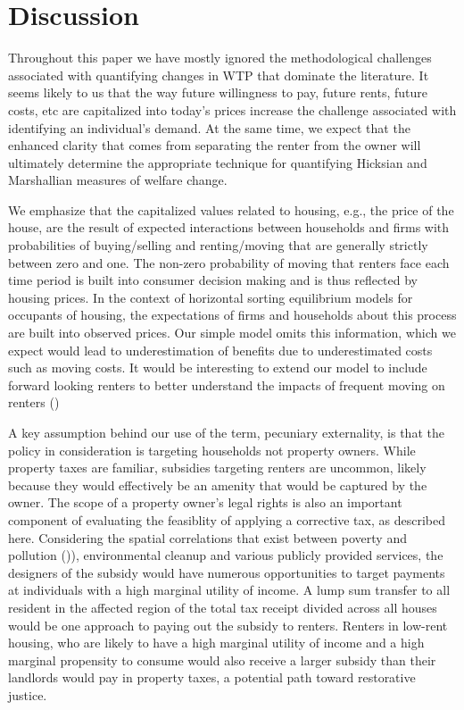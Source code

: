 \documentclass[ecta,nameyear,draft]{econsocart}
\theoremstyle{plain}
\theoremstyle{remark}
\begin{document}
\section{Discussion}
Throughout this paper we have mostly ignored the methodological challenges associated with quantifying changes in WTP that dominate the literature. It seems likely to us that the way future willingness to pay, future rents, future costs, etc are capitalized into today's prices increase the challenge associated with identifying an individual's demand. At the same time, we expect that the enhanced clarity that comes from separating the renter from the owner will ultimately determine the appropriate technique for quantifying Hicksian and Marshallian measures of welfare change.

We emphasize that the capitalized values related to housing, e.g., the price of the house, are the result of expected interactions between households and firms with probabilities of buying/selling and renting/moving that are generally strictly between zero and one. The non-zero probability of moving that renters face each time period is built into consumer decision making and is thus reflected by housing prices. In the context of horizontal sorting equilibrium models for occupants of housing, the expectations of firms and households about this process are built into observed prices. Our simple model omits this information, which we expect would lead to underestimation of benefits due to underestimated costs such as moving costs. It would be interesting to extend our model to include forward looking renters to better understand the impacts of frequent moving on renters (\cite{bishop19}) 

A key assumption behind our use of the term, pecuniary externality, is that the policy in consideration is targeting households not property owners. While property taxes are familiar, subsidies targeting renters are uncommon, likely because they would effectively be an amenity that would be captured by the owner. The scope of a property owner's legal rights is also an important component of evaluating the feasiblity of applying a corrective tax, as described here. Considering the spatial correlations that exist between poverty and pollution (\cite{banzhafJustice19})), environmental cleanup and various publicly provided services, the designers of the subsidy would have numerous opportunities to target payments at individuals with a high marginal utility of income. A lump sum transfer to all resident in the affected region of the total tax receipt divided across all houses would be one approach to paying out the subsidy to renters. Renters in low-rent housing, who are likely to have a high marginal utility of income and a high marginal propensity to consume would also receive a larger subsidy than their landlords would pay in property taxes, a potential path toward restorative justice. 
\end{document}
